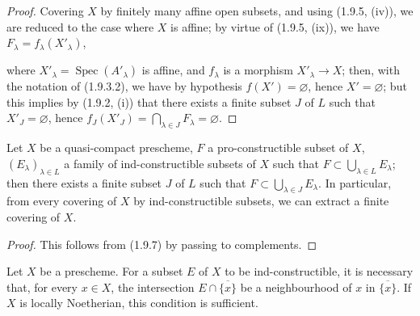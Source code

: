 \begin{proof}
Covering $X$ by finitely many affine open subsets, and using (1.9.5,
(iv)), we are reduced to the case where $X$ is affine; by virtue of (1.9.5,
(ix)), we have $F_\lambda=f_\lambda(X'_\lambda)$,


where $X'_\lambda=\operatorname{Spec}(A'_\lambda)$ is affine, and $f_\lambda$
is a morphism $X'_\lambda\to X$; then, with the notation of (1.9.3.2),
we have by hypothesis $f(X')=\varnothing$, hence $X'=\varnothing$; but this
implies by (1.9.2, (i)) that there exists a finite subset $J$ of $L$ such
that $X'_J=\varnothing$, hence
$f_J(X'_J)=\bigcap_{\lambda\in J}F_\lambda=\varnothing$.
\end{proof}

\begin{corollary}[1.9.9]
\label{IV.1.9.9}
Let $X$ be a quasi-compact prescheme, $F$ a pro-constructible subset of
$X$, $(E_\lambda)_{\lambda\in L}$ a family of ind-constructible subsets
of $X$ such that $F\subset\bigcup_{\lambda\in L}E_\lambda$; then there
exists a finite subset $J$ of $L$ such that
$F\subset\bigcup_{\lambda\in J}E_\lambda$. In particular, from every
covering of $X$ by ind-constructible subsets, we can extract a finite
covering of $X$.
\end{corollary}

\begin{proof}
This follows from (1.9.7) by passing to complements.
\end{proof}

\begin{proposition}[1.9.10]
\label{IV.1.9.10}
Let $X$ be a prescheme. For a subset $E$ of $X$ to be
ind-constructible, it is necessary that, for every $x\in X$, the intersection
$E\cap\overline{\{x\}}$ be a neighbourhood of $x$ in
$\overline{\{x\}}$. If $X$ is locally Noetherian, this condition is
sufficient.
\end{proposition}

